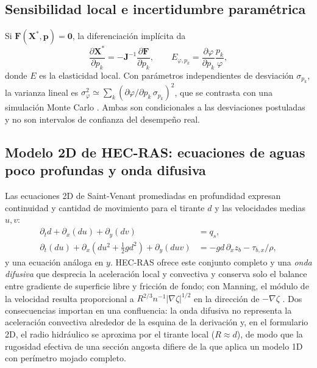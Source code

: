 \subsection{Sensibilidad local e incertidumbre paramétrica}
Si $\mathbf F(\mathbf X^\ast,\mathbf p)=\mathbf 0$, la diferenciación implícita da
\begin{equation}
\frac{\partial\mathbf X^\ast}{\partial p_k}=-\mathbf J^{-1}\frac{\partial\mathbf F}{\partial p_k},\qquad
E_{\varphi,p_k}=\frac{\partial\varphi}{\partial p_k}\frac{p_k}{\varphi},
\label{eq:elast}
\end{equation}
donde $E$ es la elasticidad local. Con parámetros independientes de desviación $\sigma_{p_k}$, la varianza lineal es $\sigma_\varphi^2\simeq\sum_k(\partial\varphi/\partial p_k\,\sigma_{p_k})^2$, que se contrasta con una simulación Monte Carlo \citep{saltelli2008}. Ambas son condicionales a las desviaciones postuladas y no son intervalos de confianza del desempeño real.

\subsection{Modelo 2D de HEC-RAS: ecuaciones de aguas poco profundas y onda difusiva}\label{sec:dw}
Las ecuaciones 2D de Saint-Venant promediadas en profundidad expresan continuidad y cantidad de movimiento para el tirante $d$ y las velocidades medias $u,v$:
\begin{align}
\partial_t d+\partial_x(du)+\partial_y(dv)&=q_s,\nonumber\\
\partial_t(du)+\partial_x\!\left(du^2+\tfrac12gd^2\right)+\partial_y(duv)&=-gd\,\partial_xz_b-\tau_{b,x}/\rho,
\label{eq:swe}
\end{align}
y una ecuación análoga en $y$. HEC-RAS ofrece este conjunto completo y una \emph{onda difusiva} que desprecia la aceleración local y convectiva y conserva solo el balance entre gradiente de superficie libre y fricción de fondo; con Manning, el módulo de la velocidad resulta proporcional a $R^{2/3}n^{-1}|\nabla\zeta|^{1/2}$ en la dirección de $-\nabla\zeta$ \citep{hecmomentum,hecmanual}. Dos consecuencias importan en una confluencia: la onda difusiva no representa la aceleración convectiva alrededor de la esquina de la derivación y, en el formulario 2D, el radio hidráulico se aproxima por el tirante local ($R\approx d$), de modo que la rugosidad efectiva de una sección angosta difiere de la que aplica un modelo 1D con perímetro mojado completo.

